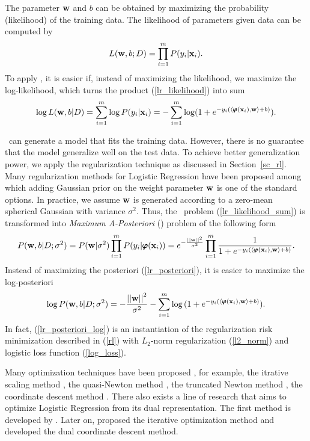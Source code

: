 {%
The parameter $\mathbf {w}$ and $b$ can be obtained by maximizing the probability (likelihood) of the training data.
The likelihood of parameters given data can be computed by
\begin{align}
	L(\mathbf {w},b;D) = \prod_{i=1}^mP(y_i|\mathbf {x}_i). \label{lr_likelihood}
\end{align}
To apply \mle, it is easier if, instead of maximizing the likelihood, we maximize the log-likelihood, which turns the product (\ref{lr_likelihood}) into sum
\begin{align}
	\log L(\mathbf {w},b|D) = \sum_{i=1}^{m}\log P(y_i|\mathbf {x}_i) = -\sum_{i=1}^{m}\log (1+e^{ -y_i(\langle \pmb \varphi(\mathbf {x}_i), \mathbf {w} \rangle+b) }) \label{lr_likelihood_sum}.
\end{align}

\mle\ can generate a model that fits the training data.
However, there is no guarantee that the model generalize well on the test data.
To achieve better generalization power, we apply the regularization technique as discussed in Section~\ref{sc_rl}.
Many regularization methods for Logistic Regression have been proposed \citep{Chen99,Chen00,Goodman03} among which adding Gaussian prior on the weight parameter $\mathbf {w}$ is one of the standard options.
In practice, we assume $\mathbf {w}$ is generated according to a zero-mean spherical Gaussian with variance $\sigma^2$.
Thus, the \mle\ problem (\ref{lr_likelihood_sum}) is transformed into \textit{Maximum A-Posteriori} (\map) problem of the following form
\begin{align}
	P(\mathbf {w},b|D;\sigma^2) = P(\mathbf {w}|\sigma^2)\prod_{i=1}^mP(y_i|\pmb \varphi(\mathbf {x}_i))=e^{ -\frac{\left|\left| \mathbf {w} \right|\right|^2}{\sigma^2} }\prod_{i=1}^{m}{\frac{1}{1+e^{ -y_i(\langle \pmb \varphi(\mathbf {x}_i), \mathbf {w} \rangle+b) }}}. \label{lr_posteriori}
\end{align}
Instead of maximizing the posteriori (\ref{lr_posteriori}), it is easier to maximize the log-posteriori
\begin{align}
	\log P(\mathbf {w},b|D;\sigma^2) = -{\frac{\left|\left| \mathbf {w} \right|\right|^2}{\sigma^2}} - \sum_{i=1}^{m}\log{(1+e^{ -y_i(\langle \pmb \varphi(\mathbf {x}_i), \mathbf {w}\rangle+b) })}. \label{lr_posteriori_log}
\end{align}
In fact, (\ref{lr_posteriori_log}) is an instantiation of the regularization risk minimization described in (\ref{rl}) with $L_2$-norm regularization (\ref{l2_norm}) and logistic loss function (\ref{log_loss}).

Many optimization techniques have been proposed \citep{Minka03}, for example, 
the {itrative scaling} method \citep{Darroch72,Pietra97inducing,Berger97,Goodman02Sequential,Jin03a},
the quasi-Newton method \citep{Minka03},
the truncated Newton method \citep{Komarek05making,Lin2008trust},
the coordinate descent method \citep{Huang09iterative}.
There also exists a line of research that aims to optimize Logistic Regression from its dual representation.
The first method is developed by \citet{Jaakkola99probabilistic}.
Later on, \citet{Keerthi05a} proposed the iterative optimization method and \citet{Yu11dual} developed the dual coordinate descent method.




}
